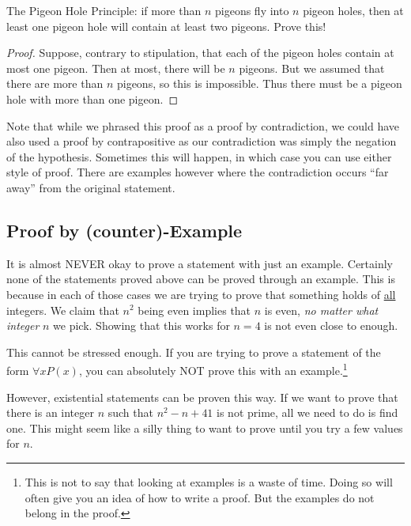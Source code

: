\documentclass[12pt]{article}
\begin{document}
 
\begin{example}
The Pigeon Hole Principle: if more than $n$ pigeons fly into $n$ pigeon holes, then at least one pigeon hole will contain at least two pigeons.  Prove this!

\begin{proof}
Suppose, contrary to stipulation, that each of the pigeon holes contain at most one pigeon.  Then at most, there will be $n$ pigeons.  But we assumed that there are more than $n$ pigeons, so this is impossible.  Thus there must be a pigeon hole with more than one pigeon.
\end{proof}

Note that while we phrased this proof as a proof by contradiction, we could have also used a proof by contrapositive as our contradiction was simply the negation of the hypothesis.  Sometimes this will happen, in which case you can use either style of proof.  There are examples however where the contradiction occurs ``far away'' from the original statement.
\end{example} 



 
 
\subsection*{Proof by (counter)-Example}

It is almost NEVER okay to prove a statement with just an example.  Certainly none of the statements proved above can be proved through an example.  This is because in each of those cases we are trying to prove that something holds of \underline{all} integers.  We claim that $n^2$ being even implies that $n$ is even, {\em no matter what integer} $n$ we pick.  Showing that this works for $n = 4$ is not even close to enough.  

This cannot be stressed enough.  If you are trying to prove a statement of the form $\forall x P(x)$, you can absolutely NOT prove this with an example.\footnote{This is not to say that looking at examples is a waste of time.  Doing so will often give you an idea of how to write a proof.  But the examples do not belong in the proof.}

However, existential statements can be proven this way.  If we want to prove that there is an integer $n$ such that $n^2-n+41$ is not prime, all we need to do is find one.  This might seem like a silly thing to want to prove until you try a few values for $n$.  
\end{document}
